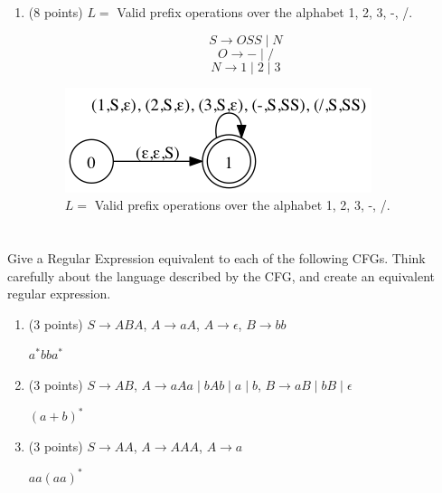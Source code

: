 \documentclass[paper=a4, fontsize=11pt]{scrartcl} %
\begin{document}
\begin{enumerate}
\item
  \begin{fancyquotes}
    (8 points) $L =$ Valid prefix operations over the alphabet 1, 2,
    3, -, /.
  \end{fancyquotes}

  $$S\rightarrow OSS \mid N$$
  $$O\rightarrow - \mid /$$
  $$N\rightarrow 1 \mid 2 \mid 3$$

  \begin{figure}[H]
    \centering
    \includegraphics[scale=.7]{5-1.gv.4.png}
    \caption{$L =$ Valid prefix operations over the alphabet 1, 2, 3, -, /.}
  \end{figure}

\end{enumerate}

\pagebreak

\section{}

\begin{fancyquotes}
  Give a Regular Expression equivalent to each of the following
  CFGs. Think carefully about the language described by the CFG, and
  create an equivalent regular expression.
\end{fancyquotes}

\begin{enumerate}
\item
  \begin{fancyquotes}
    (3 points) $S \rightarrow ABA$, $A \rightarrow aA$,
    $A \rightarrow \epsilon$, $B \rightarrow bb$
  \end{fancyquotes}

  $a^*bba^*$
\item
  \begin{fancyquotes}
    (3 points) $S \rightarrow AB$, $A \rightarrow aAa \mid bAb \mid a
    \mid b$, $B \rightarrow aB \mid bB \mid \epsilon$
  \end{fancyquotes}

  $(a+b)^*$
\item
  \begin{fancyquotes}
    (3 points) $S \rightarrow AA$, $A \rightarrow AAA$, $A \rightarrow a$
  \end{fancyquotes}

  $aa(aa)^*$
\end{enumerate}
\end{document}
